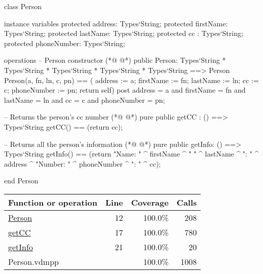 \begin{vdmpp}[breaklines=true]
class Person

instance variables
  protected address: Types`String;
  protected firstName: Types`String;
  protected lastName: Types`String;
  protected cc : Types`String;
  protected phoneNumber: Types`String;
  
operations
 -- Person constructor
(*@
\label{Person:12}
@*)
 public Person: Types`String * Types`String * Types`String * Types`String * Types`String ==> Person
  Person(a, fn, ln, c, pn) == ( address := a; firstName := fn; lastName := ln; cc := c; phoneNumber := pn; return self)
 post address = a and firstName = fn and lastName = ln and cc = c and phoneNumber = pn;
 
 -- Returns the person's cc number
(*@
\label{getCC:17}
@*)
 pure public getCC : () ==> Types`String
  getCC() == (return cc);
 
 -- Returns all the person's information
(*@
\label{getInfo:21}
@*)
 pure public getInfo: () ==> Types`String
  getInfo() == (return "Name: " ^ firstName ^ " " ^ lastName ^ "\nAddress: " ^ address ^ "\nPhone Number: " ^ phoneNumber ^ "\nCC: " ^ cc);

end Person
\end{vdmpp}
\bigskip
\begin{longtable}{|l|r|r|r|}
\hline
Function or operation & Line & Coverage & Calls \\
\hline
\hline
\hyperref[Person:12]{Person} & 12&100.0\% & 208 \\
\hline
\hyperref[getCC:17]{getCC} & 17&100.0\% & 780 \\
\hline
\hyperref[getInfo:21]{getInfo} & 21&100.0\% & 20 \\
\hline
\hline
Person.vdmpp & & 100.0\% & 1008 \\
\hline
\end{longtable}

